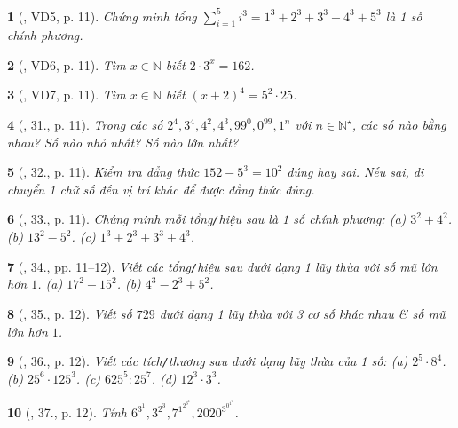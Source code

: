 \documentclass{article}
\newtheorem{baitoan}{}
\begin{document}
\begin{baitoan}[\cite{Tuyen_Toan_6}, VD5, p. 11]
	Chứng minh tổng $\sum_{i=1}^5 i^3 = 1^3 + 2^3 + 3^3 + 4^3 + 5^3$ là 1 số chính phương.
\end{baitoan}

\begin{baitoan}[\cite{Tuyen_Toan_6}, VD6, p. 11]
	Tìm $x\in\mathbb{N}$ biết $2\cdot3^x = 162$.
\end{baitoan}

\begin{baitoan}[\cite{Tuyen_Toan_6}, VD7, p. 11]
	Tìm $x\in\mathbb{N}$ biết $(x + 2)^4 = 5^2\cdot25$.
\end{baitoan}

\begin{baitoan}[\cite{Tuyen_Toan_6}, 31., p. 11]
	Trong các số $2^4,3^4,4^2,4^3,99^0,0^{99},1^n$ với $n\in\mathbb{N}^\star$, các số nào bằng nhau? Số nào nhỏ nhất? Số nào lớn nhất?
\end{baitoan}

\begin{baitoan}[\cite{Tuyen_Toan_6}, 32., p. 11]
	Kiểm tra đẳng thức $152 - 5^3 = 10^2$ đúng hay sai. Nếu sai, di chuyển 1 chữ số đến vị trí khác để được đẳng thức đúng.
\end{baitoan}

\begin{baitoan}[\cite{Tuyen_Toan_6}, 33., p. 11]
	Chứng minh mỗi tổng{\tt/}hiệu sau là 1 số chính phương: (a) $3^2 + 4^2$. (b) $13^2 - 5^2$. (c) $1^3 + 2^3 + 3^3 + 4^3$.
\end{baitoan}

\begin{baitoan}[\cite{Tuyen_Toan_6}, 34., pp. 11--12]
	Viết các tổng{\tt/}hiệu sau dưới dạng 1 lũy thừa với số mũ lớn hơn $1$. (a) $17^2 - 15^2$. (b) $4^3 - 2^3 + 5^2$. 
\end{baitoan}

\begin{baitoan}[\cite{Tuyen_Toan_6}, 35., p. 12]
	Viết số $729$ dưới dạng 1 lũy thừa với 3 cơ số khác nhau \& số mũ lớn hơn $1$.
\end{baitoan}

\begin{baitoan}[\cite{Tuyen_Toan_6}, 36., p. 12]
	Viết các tích{\tt/}thương sau dưới dạng lũy thừa của 1 số: (a) $2^5\cdot8^4$. (b) $25^6\cdot125^3$. (c) $625^5:25^7$. (d) $12^3\cdot3^3$.
\end{baitoan}

\begin{baitoan}[\cite{Tuyen_Toan_6}, 37., p. 12]
	Tính $6^{3^1},3^{2^3},7^{1^{2^{3^4}}},2020^{3^{0^{1^0}}}$.
\end{baitoan}
\end{document}
